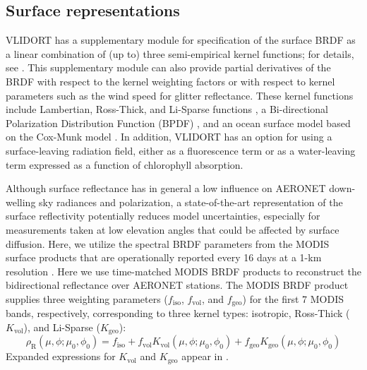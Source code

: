 \subsection{Surface representations} \label{subsec:surface}

VLIDORT has a supplementary module for specification of the surface BRDF
as a linear combination of (up to) three semi-empirical kernel
functions; for details, see \citet{Spurr04}. This supplementary module can also
provide partial derivatives of the BRDF with respect to the kernel
weighting factors or with respect to kernel parameters such as the wind
speed for glitter reflectance. These kernel functions include
Lambertian, Ross-Thick, and Li-Sparse functions \citep{Wanner95, Lucht00}, a
Bi-directional Polarization Distribution Function (BPDF)
\citep{Maignan09}, and an ocean surface model based on the 
Cox-Munk model \citep{Cox54}. In addition, VLIDORT has
an option for using a surface-leaving radiation field, either as a
fluorescence term or as a water-leaving term expressed as a function of
chlorophyll absorption.

Although surface reflectance has in general a low influence on AERONET
down-welling sky radiances and polarization, a state-of-the-art
representation of the surface reflectivity potentially reduces model
uncertainties, especially for measurements taken at low elevation angles
that could be affected by surface diffusion. Here, we utilize the
spectral BRDF parameters from the MODIS surface products that are
operationally reported every 16 days at a 1-km resolution
\citep{Lucht00}. Here we use time-matched MODIS BRDF products 
to reconstruct the bidirectional reflectance over AERONET stations.
The MODIS BRDF product supplies three weighting parameters
($f_\text{iso}$, $f_\text{vol}$, and $f_\text{geo}$) for the first 
7 MODIS bands, respectively, corresponding to three kernel types:
isotropic, Ross-Thick ($K_\text{vol}$), and Li-Sparse ($K_\text{geo}$):
\begin{equation}
\rho_\text{R}(\mu,\phi;\mu_0,\phi_0) = f_\text{iso} + 
f_\text{vol}K_\text{vol}(\mu,\phi;\mu_0,\phi_0) +
f_\text{geo}K_\text{geo}(\mu,\phi;\mu_0,\phi_0)  \label{eq:brdf}
\end{equation}
Expanded expressions for $K_\text{vol}$ and $K_\text{geo}$ appear in
\citet{Wanner95, Lucht00}. 

